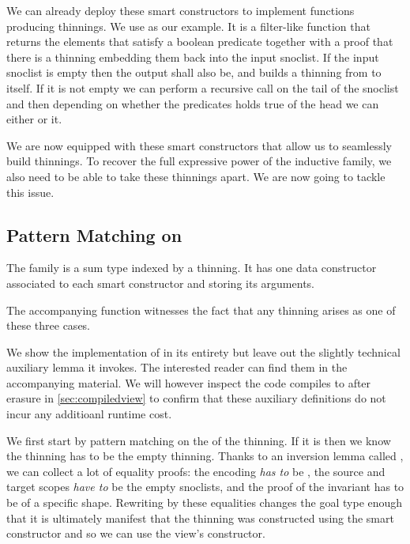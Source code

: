 We can already deploy these smart constructors to implement functions producing
thinnings. We use  as our example. It is a filter-like
function that returns the elements that satisfy a boolean predicate together with
a proof that there is a thinning embedding them back into the input snoclist.
%
If the input snoclist is empty then the output shall also be, and
 builds a thinning from \IdrisData{[<]} to itself.
%
If it is not empty we can perform a recursive call on the tail of the snoclist
and then depending on whether the predicates holds true of the head we can either
 or  it.


We are now equipped with these smart constructors that allow us to seamlessly
build thinnings.
%
To recover the full expressive power of the inductive family, we also need to
be able to take these thinnings apart. We are now going to tackle this issue.

\subsection{Pattern Matching on }

The  family is a sum type indexed by a thinning. It has one
data constructor associated to each smart constructor and storing its arguments.


The accompanying  function witnesses the fact that any
thinning arises as one of these three cases.


We show the implementation of  in its entirety but leave
out the slightly technical auxiliary lemma it invokes.
%
The interested reader can find them in the accompanying material.
%
We will however inspect the code  compiles to after erasure
in \cref{sec:compiledview} to confirm that these auxiliary definitions do not
incur any additioanl runtime cost.

We first start by pattern matching on the  of the thinning.
If it is  then we know the thinning has to be the empty thinning.
%
Thanks to an inversion lemma called , we can collect a lot
of equality proofs: the encoding \emph{has to} be , the
source and target scopes \emph{have to} be the empty snoclists, and the
proof of the invariant has to be of a specific shape.
%
Rewriting by these equalities changes the goal type enough that it is ultimately
manifest that the thinning was constructed using the  smart
constructor and so we can use the view's  constructor.

